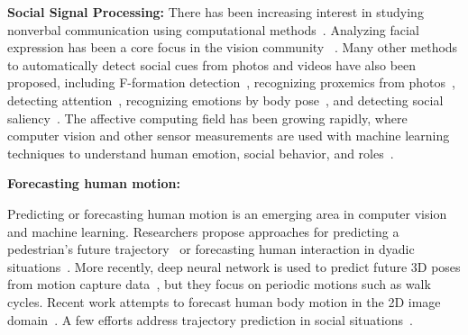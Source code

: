 




\textbf{Social Signal Processing:}
There has been increasing interest in studying nonverbal communication using computational methods~\cite{vinciarelli2009social, vinciarelli2012bridging}. Analyzing facial expression has been a core focus in the vision community ~\cite{ChuDC13, Torre15, shan2009facial}. Many other methods to automatically detect social cues from photos and videos have also been proposed, including F-formation detection~\cite{setti2015f}, recognizing proxemics from photos~\cite{yang2012recognizing}, detecting attention~\cite{Fathi-2012}, recognizing emotions by body pose~\cite{schindler2008recognizing}, and detecting social saliency~\cite{park20123d}. The affective computing field has been growing rapidly, where computer vision and other sensor measurements are used with machine learning techniques to understand human emotion, social behavior, and roles~\cite{picard1997affective, picard2003affective,poria2017review}. 

\textbf{Forecasting human motion:}

Predicting or forecasting human motion is an emerging area in computer vision and machine learning. Researchers propose approaches for predicting a pedestrian's future trajectory~\cite{kitani2012activity} or forecasting human interaction in dyadic situations~\cite{huang2014action}. More recently, deep neural network is used to predict future 3D poses from motion capture data~\cite{mnih2012conditional, Fragkiadaki_2015_ICCV, jain2016structural}, but they focus on periodic motions such as walk cycles. Recent work attempts to forecast human body motion in the 2D image domain~\cite{walker2016uncertain, villegas2017learning}. A few efforts address trajectory prediction in social situations~\cite{helbing1995social, alahi2016social, gupta2018social}. 

%

